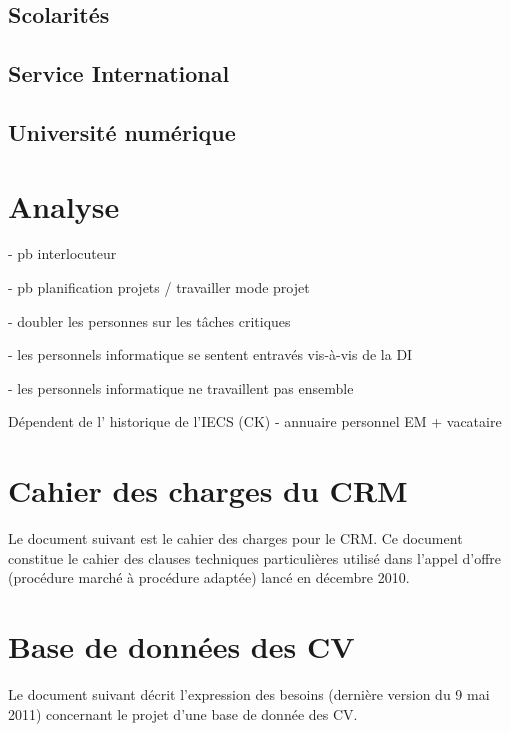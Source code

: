 \documentclass{book}
\begin{document}
 
\section{Scolarités}


\section{Service International}

\section{Université numérique}



\chapter{Analyse}

 - pb interlocuteur

- pb planification projets / travailler mode projet 

- doubler les personnes sur les tâches critiques

- les personnels informatique se sentent entravés vis-à-vis de la DI

- les personnels informatique ne travaillent pas ensemble

Dépendent de l' historique de l'IECS (CK)
- annuaire personnel EM + vacataire




\appendix

\chapter{Cahier des charges du CRM}
\label{ch:annexe-crm}

Le document suivant est le cahier des charges pour le CRM.
Ce document constitue le cahier des clauses techniques particulières
utilisé dans l'appel d'offre (procédure marché à procédure adaptée)
lancé en décembre 2010. 




\chapter{Base de données des CV}
\label{ch:rh-cvtheque}

Le document suivant décrit l'expression des besoins (dernière version du 9 mai 2011)
concernant le projet d'une base de donnée des CV.




\printindex
\end{document}
